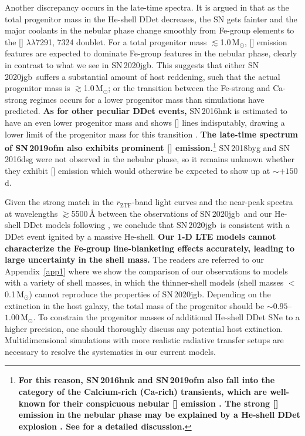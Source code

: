 \documentclass[twocolumn]{aastex631}
\newcommand{\sn}{SN\,2020jgb}
\newcommand{\Msun}{\mathrm{M_\odot}}
\newcommand{\revise}[1]{\textbf{#1}}
\begin{document}
Another discrepancy occurs in the late-time spectra. It is argued in \citet{polin_nebular_2021} that as the total progenitor mass in the He-shell DDet decreases, the SN gets fainter and the major coolants in the nebular phase change smoothly from Fe-group elements to the [] $\lambda\lambda$7291, 7324 doublet.
For a total progenitor mass $\lesssim$1.0\,$\Msun$, [] emission features are expected to dominate Fe-group features in the nebular phase, clearly in contrast to what we see in \sn. This suggests that either \sn\ suffers a substantial amount of host reddening, such that the actual progenitor mass is $\gtrsim$1.0\,$\Msun$; or the transition between the Fe-strong and Ca-strong regimes occurs for a lower progenitor mass than simulations have predicted.  
\revise{As for other peculiar DDet events,} SN\,2016hnk is estimated to have an even lower progenitor mass \citep[$\sim$0.87\,$\Msun$;][]{jacobson-galan_16hnk_2020} and shows [] lines indisputably, drawing a lower limit of the progenitor mass for this transition \citep[c.f.,][for discussion on the potential host galaxy extinction on SN\,2016hnk]{galbany_16hnk_2019}. \revise{The late-time spectrum of SN\,2019ofm also exhibits prominent [] emission.}\footnote{\revise{For this reason, SN\,2016hnk and SN\,2019ofm also fall into the category of the Calcium-rich (Ca-rich) transients, which are well-known for their conspicuous nebular [\ion{Ca}{2}] emission \citep{Filippenko_2003, Perets_2010, Kasliwal_2012}. The strong [\ion{Ca}{2}] emission in the nebular phase may be explained by a He-shell DDet explosion \citep{Dessart_2015,polin_observational_2019}. See \citet{de_Ca_rich_2020} for a detailed discussion.}} SN\,2018byg and SN\,2016dsg were not observed in the nebular phase, so it remains unknown whether they exhibit [] emission which would otherwise be expected to show up at $\sim$$+150$\,d.

Given the strong match in the $r_\mathrm{ZTF}$-band light curves and the near-peak spectra at wavelengths $\gtrsim$5500\,\r{A} between the observations of \sn\ and our He-shell DDet models following \citet{polin_observational_2019}, we conclude that \sn\ is consistent with a DDet event ignited by a massive He-shell. \revise{Our 1-D LTE models cannot characterize the Fe-group line-blanketing effects accurately, leading to large uncertainty in the shell mass.} The readers are referred to our Appendix~\ref{app1} where we show the comparison of our observations to models with a variety of shell masses, in which the thinner-shell models (shell masses $<$0.1\,$\Msun$) cannot reproduce the properties of \sn. Depending on the extinction in the host galaxy, the total mass of the progenitor should be $\sim$$0.95$--$1.00\,\Msun$. To constrain the progenitor masses of additional He-shell DDet SNe to a higher precision, one should thoroughly discuss any potential host extinction. Multidimensional simulations with more realistic radiative transfer setups are necessary to resolve the systematics in our current models.
\end{document}
